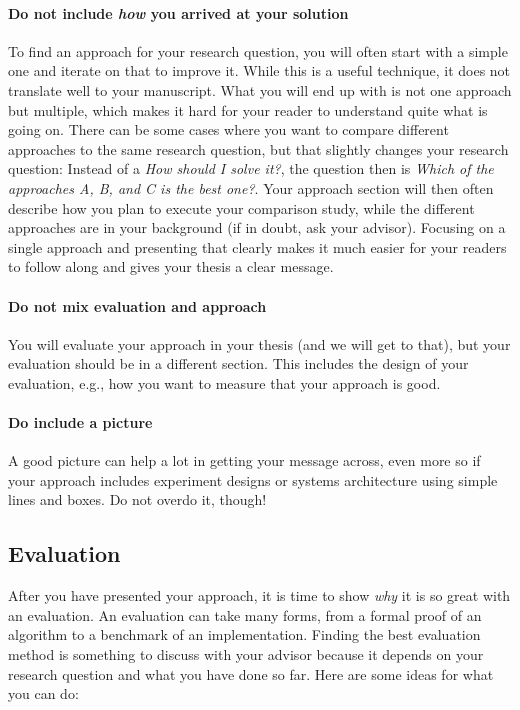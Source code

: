 \documentclass[a4]{article}
\begin{document}
\paragraph{Do not include \emph{how} you arrived at your solution}
To find an approach for your research question, you will often start with a simple one and iterate on that to improve it.
While this is a useful technique, it does not translate well to your manuscript.
What you will end up with is not one approach but multiple, which makes it hard for your reader to understand quite what is going on.
There can be some cases where you want to compare different approaches to the same research question, but that slightly changes your research question:
Instead of a \emph{How should I solve it?}, the question then is \emph{Which of the approaches A, B, and C is the best one?}.
Your approach section will then often describe how you plan to execute your comparison study, while the different approaches are in your background (if in doubt, ask your advisor).
Focusing on a single approach and presenting that clearly makes it much easier for your readers to follow along and gives your thesis a clear message.

\paragraph{Do not mix evaluation and approach}
You will evaluate your approach in your thesis (and we will get to that), but your evaluation should be in a different section.
This includes the design of your evaluation, e.g., how you want to measure that your approach is good.

\paragraph{Do include a picture}
A good picture can help a lot in getting your message across, even more so if your approach includes experiment designs or systems architecture using simple lines and boxes.
Do not overdo it, though!

\subsection{Evaluation}

After you have presented your approach, it is time to show \emph{why} it is so great with an evaluation.
An evaluation can take many forms, from a formal proof of an algorithm to a benchmark of an implementation.
Finding the best evaluation method is something to discuss with your advisor because it depends on your research question and what you have done so far.
Here are some ideas for what you can do:
\end{document}
